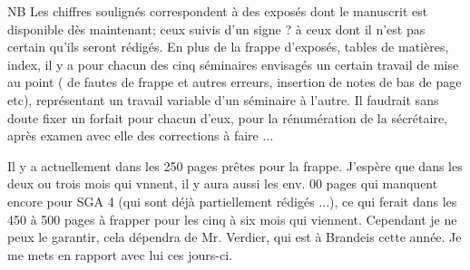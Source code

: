 
NB Les chiffres soulignés correspondent à des exposés dont le manuscrit est disponible dès maintenant; ceux suivis d'un signe ? à ceux dont il n'est pas certain qu'ils seront rédigés. En plus de la frappe d'exposés, tables de matières, index, il y a pour chacun des cinq séminaires envisagés un certain travail de mise au point ( de fautes de frappe et autres erreurs, insertion de notes de bas de page etc), représentant un travail variable d'un séminaire à l'autre. Il faudrait sans doute fixer un forfait pour chacun d'eux, pour la rénumération de la sécrétaire, après examen avec elle des corrections à faire ...

Il y a actuellement dans les 250 pages prêtes pour la frappe. J'espère que dans les deux ou trois mois qui vnnent, il y aura aussi les env. 00 pages qui manquent encore pour SGA 4 (qui sont déjà partiellement rédigés ...), ce qui ferait dans les 450 à 500 pages à frapper pour les cinq à six mois qui viennent. Cependant je ne peux le garantir, cela dépendra de Mr. Verdier, qui est à Brandeis cette année. Je me mets en rapport avec lui ces jours-ci.

